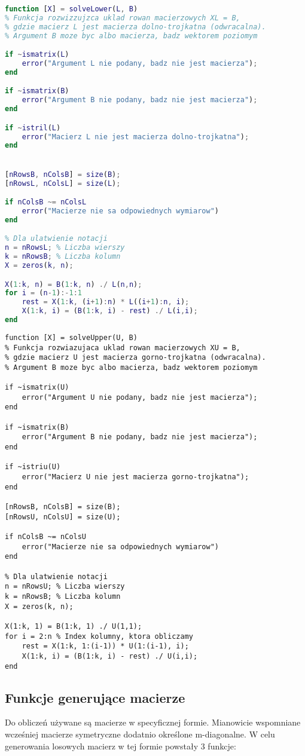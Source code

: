 \documentclass[12pt]{article}
\begin{document}
\begin{lstlisting}[language=Matlab]
function [X] = solveLower(L, B)
% Funkcja rozwizzujzca uklad rowan macierzowych XL = B,
% gdzie macierz L jest macierza dolno-trojkatna (odwracalna).
% Argument B moze byc albo macierza, badz wektorem poziomym

if ~ismatrix(L)
    error("Argument L nie podany, badz nie jest macierza");
end

if ~ismatrix(B)
    error("Argument B nie podany, badz nie jest macierza");
end

if ~istril(L)
    error("Macierz L nie jest macierza dolno-trojkatna");
end


[nRowsB, nColsB] = size(B);
[nRowsL, nColsL] = size(L);

if nColsB ~= nColsL
    error("Macierze nie sa odpowiednych wymiarow")
end

% Dla ulatwienie notacji
n = nRowsL; % Liczba wierszy
k = nRowsB; % Liczba kolumn
X = zeros(k, n);

X(1:k, n) = B(1:k, n) ./ L(n,n);
for i = (n-1):-1:1
    rest = X(1:k, (i+1):n) * L((i+1):n, i);
    X(1:k, i) = (B(1:k, i) - rest) ./ L(i,i);
end
\end{lstlisting}

\begin{lstlisting}
function [X] = solveUpper(U, B)
% Funkcja rozwiazujaca uklad rowan macierzowych XU = B,
% gdzie macierz U jest macierza gorno-trojkatna (odwracalna).
% Argument B moze byc albo macierza, badz wektorem poziomym

if ~ismatrix(U)
    error("Argument U nie podany, badz nie jest macierza");
end

if ~ismatrix(B)
    error("Argument B nie podany, badz nie jest macierza");
end

if ~istriu(U)
    error("Macierz U nie jest macierza gorno-trojkatna");
end

[nRowsB, nColsB] = size(B);
[nRowsU, nColsU] = size(U);

if nColsB ~= nColsU
    error("Macierze nie sa odpowiednych wymiarow")
end

% Dla ulatwienie notacji
n = nRowsU; % Liczba wierszy
k = nRowsB; % Liczba kolumn
X = zeros(k, n);

X(1:k, 1) = B(1:k, 1) ./ U(1,1);
for i = 2:n % Index kolumny, ktora obliczamy
    rest = X(1:k, 1:(i-1)) * U(1:(i-1), i);
    X(1:k, i) = (B(1:k, i) - rest) ./ U(i,i);
end
\end{lstlisting}

\subsection{Funkcje generujące macierze}
Do obliczeń używane są macierze w specyficznej formie. Mianowicie wspomniane wcześniej macierze symetryczne dodatnio określone m-diagonalne. W celu generowania losowych macierz w tej formie powstały 3 funkcje:
\end{document}
